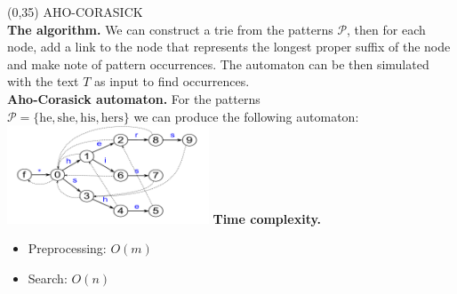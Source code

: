 \documentclass[a4paper]{article} %
\begin{document}
  \begin{textblock}{60}(0,35)
    {\sffamily\normalsize{\color{sciorange}AHO-CORASICK}}\vspace{1mm}\\ %
    \footnotesize
      \textbf{The algorithm.} We can construct a trie from the patterns $\mathcal P$, then for each node, add a link to the node that represents the longest proper suffix of the node and make note of pattern occurrences. The automaton can be then simulated with the text $T$ as input to find occurrences.\vspace{1mm}\\
      \textbf{Aho-Corasick automaton.} For the patterns \\
      $\mathcal P = \{\text{he},\text{she},\text{his},\text{hers}\}$
      we can produce the following automaton:\\
      \includegraphics[width=60mm]{AC-automaton.pdf}
      \textbf{Time complexity.}
      \begin{itemize}[labelindent=2mm,leftmargin=*,itemsep=1mm, topsep=1mm]
        \item Preprocessing: $O(m)$
        \item Search: $O(n)$
      \end{itemize}
  \end{textblock} 
  
\end{document}
